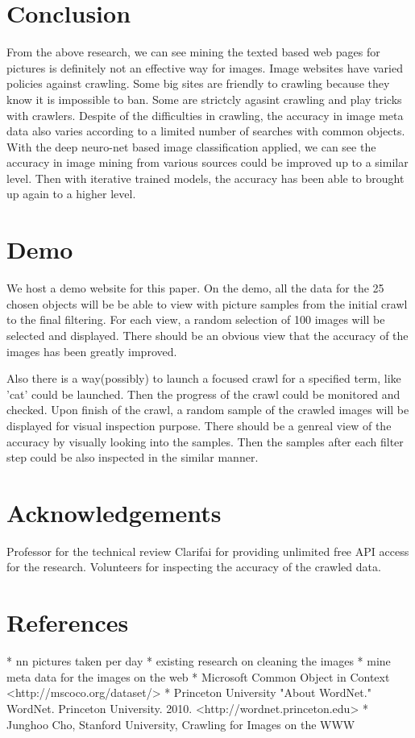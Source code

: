 \documentclass[paper=a4, fontsize=11pt]{scrartcl}
\numberwithin{equation}{section}		%
\numberwithin{figure}{section}			%
\numberwithin{table}{section}				%
\begin{document}
\section{Conclusion}
From the above research, we can see mining the texted based web pages for pictures is definitely not an effective way for images. Image websites have varied policies against crawling. Some big sites are friendly to crawling because they know it is impossible to ban. Some are strictcly agasint crawling and play tricks with crawlers. Despite of the difficulties in crawling, the accuracy in image meta data also varies according to a limited number of searches with common objects. With the deep neuro-net based image classification applied, we can see the accuracy in image mining from various sources could be improved up to a similar level. Then with iterative trained models, the accuracy has been able to brought up again to a higher level.

\section{Demo}

We host a demo website for this paper. On the demo, all the data for the 25 chosen objects will be be able to view with picture samples from the initial crawl to the final filtering. For each view, a random selection of 100 images will be selected and displayed. There should be an obvious view that the accuracy of the images has been greatly improved.

Also there is a way(possibly) to launch a focused crawl for a specified term, like 'cat' could be launched. Then the progress of the crawl could be monitored and checked.
Upon finish of the crawl, a random sample of the crawled images will be displayed for visual inspection purpose. There should be a genreal view of the accuracy by visually looking into the samples.
Then the samples after each filter step could be also inspected in the similar manner.

\section{Acknowledgements}

Professor for the technical review
Clarifai for providing unlimited free API access for the research.
Volunteers for inspecting the accuracy of the crawled data.

\section{References}


 * nn pictures taken per day
 * existing research on cleaning the images
 * mine meta data for the images on the web
 * Microsoft Common Object in Context <http://mscoco.org/dataset/>
 * Princeton University "About WordNet." WordNet. Princeton University. 2010. <http://wordnet.princeton.edu>
 * Junghoo Cho, Stanford University, Crawling for Images on the WWW
\end{document}
